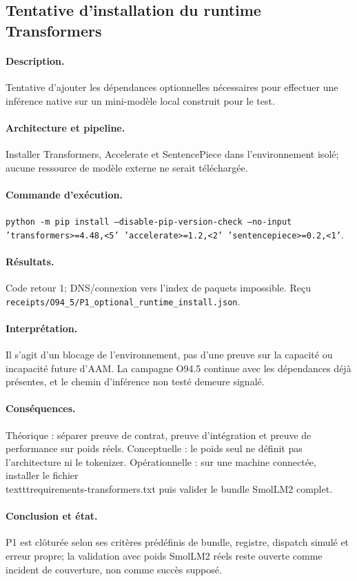 \documentclass[11pt,a4paper]{article}
\begin{document}
\subsection{Tentative d’installation du runtime Transformers}
\paragraph{Description.} Tentative d’ajouter les dépendances optionnelles nécessaires pour effectuer une inférence native sur un mini-modèle local construit pour le test.
\paragraph{Architecture et pipeline.} Installer Transformers, Accelerate et SentencePiece dans l’environnement isolé; aucune ressource de modèle externe ne serait téléchargée.
\paragraph{Commande d’exécution.} \texttt{python -m pip install --disable-pip-version-check --no-input 'transformers>=4.48,<5' 'accelerate>=1.2,<2' 'sentencepiece>=0.2,<1'}.
\paragraph{Résultats.} Code retour 1; DNS/connexion vers l’index de paquets impossible. Reçu \texttt{receipts/O94\_5/P1\_optional\_runtime\_install.json}.
\paragraph{Interprétation.} Il s’agit d’un blocage de l’environnement, pas d’une preuve sur la capacité ou incapacité future d’AAM. La campagne O94.5 continue avec les dépendances déjà présentes, et le chemin d’inférence non testé demeure signalé.
\paragraph{Conséquences.} Théorique : séparer preuve de contrat, preuve d’intégration et preuve de performance sur poids réels. Conceptuelle : le poids seul ne définit pas l’architecture ni le tokenizer. Opérationnelle : sur une machine connectée, installer le fichier \\texttt{requirements-transformers.txt} puis valider le bundle SmolLM2 complet.
\paragraph{Conclusion et état.} P1 est clôturée selon ses critères prédéfinis de bundle, registre, dispatch simulé et erreur propre; la validation avec poids SmolLM2 réels reste ouverte comme incident de couverture, non comme succès supposé.
\end{document}
